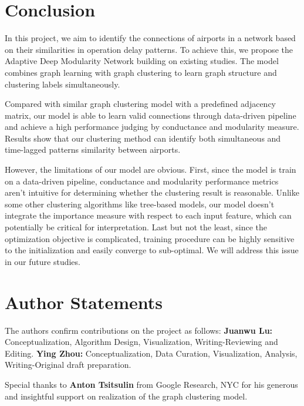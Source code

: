 \chapter{Conclusion}
\pagestyle{fancy}

In this project, we aim to identify the connections of airports in a network based on their similarities in operation delay patterns. To achieve this, we propose the Adaptive Deep Modularity Network building on existing studies. The model combines graph learning with graph clustering to learn graph structure and clustering labels simultaneously.

Compared with similar graph clustering model with a predefined adjacency matrix, our model is able to learn valid connections through data-driven pipeline and achieve a high performance judging by conductance and modularity measure. Results show that our clustering method can identify both simultaneous and time-lagged patterns similarity between airports. 

However, the limitations of our model are obvious. First, since the model is train on a data-driven pipeline, conductance and modularity performance metrics aren't intuitive for determining whether the clustering result is reasonable. Unlike some other clustering algorithms like tree-based models, our model doesn't integrate the importance measure with respect to each input feature, which can potentially be critical for interpretation. Last but not the least, since the optimization objective is complicated, training procedure can be highly sensitive to the initialization and easily converge to sub-optimal. We will address this issue in our future studies.



\chapter*{Author Statements}

The authors confirm contributions on the project as follows: \textbf{Juanwu Lu:} Conceptualization, Algorithm Design, Visualization, Writing-Reviewing and Editing. \textbf{Ying Zhou:} Conceptualization, Data Curation, Visualization, Analysis, Writing-Original draft preparation.

Special thanks to \textbf{Anton Tsitsulin} from Google Research, NYC for his generous and insightful support on realization of the graph clustering model.
